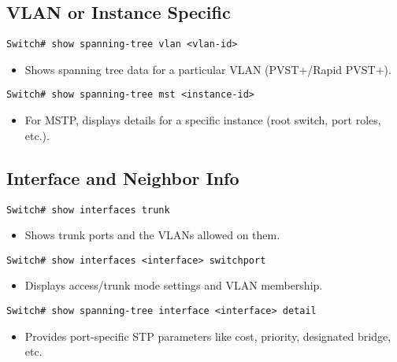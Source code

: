 \documentclass[a4paper]{report}
\begin{document}
\subsection{VLAN or Instance Specific}
\begin{lstlisting}
Switch# show spanning-tree vlan <vlan-id>
\end{lstlisting}
\begin{itemize}
    \item Shows spanning tree data for a particular VLAN (PVST+/Rapid PVST+).
\end{itemize}
\begin{lstlisting}
Switch# show spanning-tree mst <instance-id>
\end{lstlisting}
\begin{itemize}
    \item For MSTP, displays details for a specific instance (root switch, port roles, etc.).
\end{itemize}

\subsection{Interface and Neighbor Info}
\begin{lstlisting}
Switch# show interfaces trunk
\end{lstlisting}
\begin{itemize}
    \item Shows trunk ports and the VLANs allowed on them.
\end{itemize}
\begin{lstlisting}
Switch# show interfaces <interface> switchport
\end{lstlisting}
\begin{itemize}
    \item Displays access/trunk mode settings and VLAN membership.
\end{itemize}
\begin{lstlisting}
Switch# show spanning-tree interface <interface> detail
\end{lstlisting}
\begin{itemize}
    \item Provides port-specific STP parameters like cost, priority, designated bridge, etc.
\end{itemize}
\end{document}
